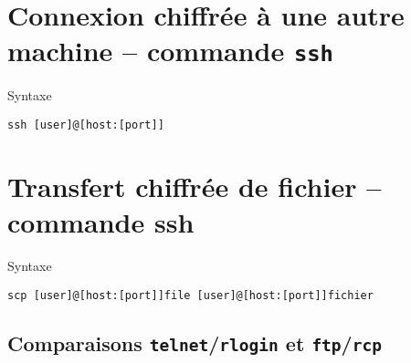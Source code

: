\section{Connexion chiffr{\'e}e {\`a} une autre machine -- commande {\tt ssh}}

\begin{definition}{Syntaxe}
\begin{verbatim}
ssh [user]@[host:[port]]
\end{verbatim}
\end{definition}

\section{Transfert chiffr{\'e}e de fichier -- commande ssh}

\begin{definition}{Syntaxe}
\begin{verbatim}
scp [user]@[host:[port]]file [user]@[host:[port]]fichier 
\end{verbatim}
\end{definition}

\subsection{Comparaisons \texttt{telnet}/\texttt{rlogin} et \texttt{ftp}/\texttt{rcp}}

